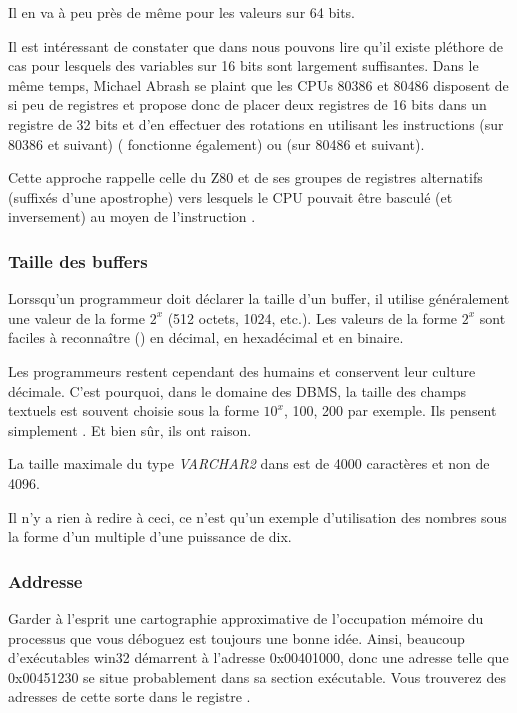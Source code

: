 Il en va à peu près de même pour les valeurs sur 64 bits.


Il est intéressant de constater que dans 
nous pouvons lire qu'il existe pléthore de cas pour lesquels des variables sur 16 bits sont largement suffisantes.
Dans le même temps, Michael Abrash se plaint que les CPUs 80386 et 80486 disposent de si peu de registres et propose donc de
placer deux registres de 16 bits dans un registre de 32 bits et d'en effectuer des rotations en utilisant les instructions
 (sur 80386 et suivant) ( fonctionne également) ou
 (sur 80486 et suivant).

Cette approche rappelle celle du Z80 et de ses groupes de registres alternatifs (suffixés d'une apostrophe)
vers lesquels le CPU pouvait être basculé (et inversement) au moyen de l'instruction .

\subsubsection{Taille des buffers}

Lorssqu'un programmeur doit déclarer la taille d'un buffer, il utilise généralement une valeur de la
forme $2^x$ (512 octets, 1024, etc.).
Les valeurs de la forme $2^x$ sont faciles à reconnaître () en décimal, en hexadécimal
et en binaire.

Les programmeurs restent cependant des humains et conservent leur culture décimale.
C'est pourquoi, dans le domaine des \ac{DBMS}, la taille des champs textuels est souvent choisie sous la forme $10^x$,
100, 200 par exemple.
Ils pensent simplement .
Et bien sûr, ils ont raison.

La taille maximale du type \emph{VARCHAR2} dans \oracle est de 4000 caractères et non de 4096.

Il n'y a rien à redire à ceci, ce n'est qu'un exemple d'utilisation des nombres sous la forme d'un
multiple d'une puissance de dix.

\subsubsection{Addresse}

Garder à l'esprit une cartographie approximative de l'occupation mémoire du processus que vous
déboguez est toujours une bonne idée.
Ainsi, beaucoup d'exécutables win32 démarrent à l'adresse 0x00401000, donc une adresse telle que
0x00451230 se situe probablement dans sa section exécutable. Vous trouverez des adresses de cette
sorte dans le registre .

